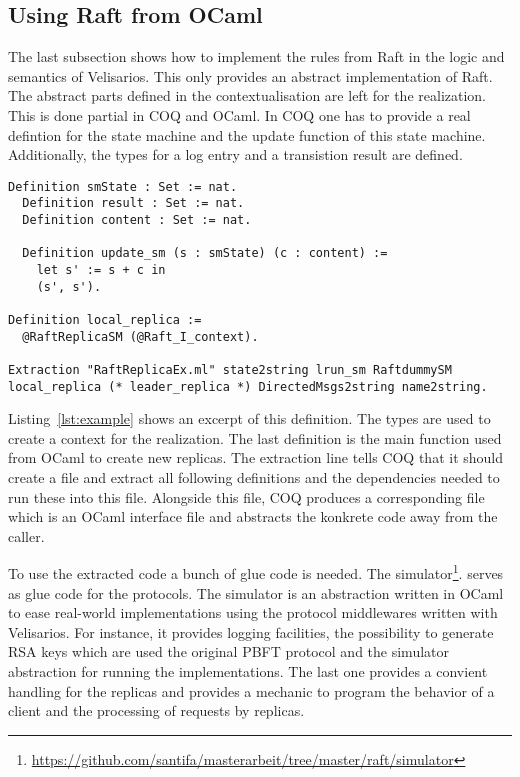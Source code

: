 \subsection{Using Raft from OCaml}
The last subsection shows how to implement the rules
from Raft in the logic and semantics of Velisarios.
This only provides an abstract implementation of
Raft. The abstract parts defined in the contextualisation
are left for the realization. This is done partial
in COQ and OCaml. In COQ one has to provide a real
defintion for the state machine and the update function
of this state machine. Additionally, the types for
a log entry and a transistion result are defined.

\begin{lstlisting}[style=coq,label=lst:example,
caption=The definitions on how a node changes it node state.]
  Definition smState : Set := nat.
  Definition result : Set := nat.
  Definition content : Set := nat.

  Definition update_sm (s : smState) (c : content) :=
    let s' := s + c in
    (s', s').

Definition local_replica :=
  @RaftReplicaSM (@Raft_I_context).

Extraction "RaftReplicaEx.ml" state2string lrun_sm RaftdummySM local_replica (* leader_replica *) DirectedMsgs2string name2string.
\end{lstlisting}

Listing~\ref{lst:example} shows an excerpt of this definition.
The types are used to create a context for the realization.
The last definition is the main function used from OCaml to
create new replicas.
The extraction line tells COQ that it should create a file
 and extract all following definitions
and the dependencies needed to run these into this file. 
Alongside this file, COQ produces a corresponding 
file which is an OCaml interface file and abstracts the
konkrete code away from the caller.

To use the extracted code a bunch of glue code is needed.
The simulator\footnote{\url{https://github.com/santifa/masterarbeit/tree/master/raft/simulator}}.
serves as glue code for the protocols.
The simulator is an abstraction written in OCaml to ease
real-world implementations using the protocol middlewares
written with Velisarios.  
For instance, it provides logging facilities, 
the possibility to generate RSA keys which are used the original
PBFT protocol and the simulator abstraction for
running the implementations. The last one provides
a convient handling for the replicas and provides
a mechanic to program the behavior of a client and
the processing of requests by replicas.

